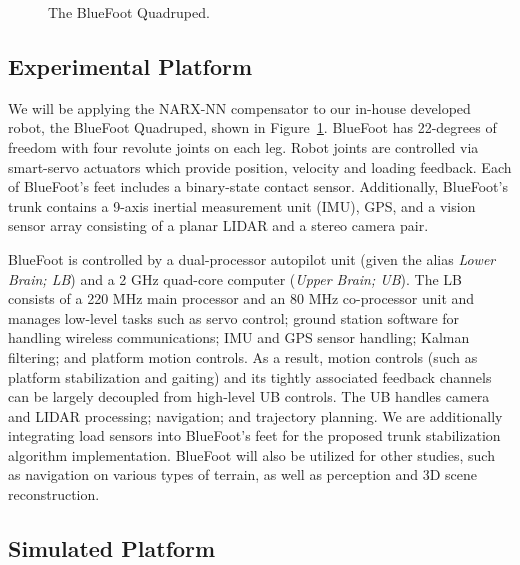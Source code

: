 
	\begin{figure}[t!]\centering
		\centering
		\caption{ The BlueFoot Quadruped.}
		\label{fig::bluefoot}
		\PostImageCloseSpace
	\end{figure}
\subsection{Experimental Platform}

We will be applying the NARX-NN compensator to our in-house developed robot, the BlueFoot Quadruped, shown in
Figure~\ref{fig::bluefoot}. BlueFoot has 22-degrees of freedom with four revolute joints on each leg.
Robot joints are controlled via smart-servo actuators which provide position, velocity and
loading feedback. Each of BlueFoot's feet includes a binary-state contact sensor.
Additionally, BlueFoot's trunk contains a 9-axis inertial measurement unit (IMU), GPS, 
and a vision sensor array consisting of a planar LIDAR and a stereo camera pair.

BlueFoot is controlled by a dual-processor autopilot unit (given the alias \emph{Lower Brain; LB}) 
and a 2 GHz  quad-core computer (\emph{Upper Brain; UB}). The LB consists of a 220 MHz main processor 
and an 80 MHz co-processor  unit and manages low-level tasks such as servo 
control;  ground station software for handling wireless communications; IMU and GPS sensor handling; Kalman filtering;
and platform motion controls. As a result, motion controls (such as platform stabilization and gaiting) and its tightly 
associated feedback channels can be largely decoupled from high-level UB controls. The UB handles camera and LIDAR 
processing; navigation; and trajectory planning.
We are additionally integrating load sensors into BlueFoot's feet for the proposed trunk stabilization
algorithm implementation. BlueFoot will also be utilized for other studies, such as navigation on
various types of terrain, as well as perception and 3D scene reconstruction.



\subsection{Simulated Platform}


